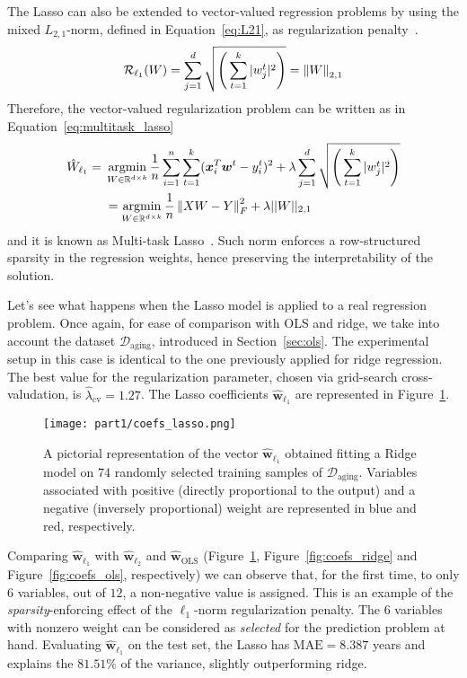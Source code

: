 			The Lasso can also be extended to vector-valued regression problems by using the mixed $L_{2,1}$-norm, defined in Equation~\eqref{eq:L21}, as regularization penalty~\cite{gramfort2012mixed}.
			\begin{equation}\label{eq:L21}
				\mathcal{R}_{\ell_1}(W)= \sum_{j=1}^d\sqrt{\Bigg(\sum_{t=1}^k |w_j^t|^2\Bigg)} = \left\lVert W\right\rVert_{2,1}
			\end{equation}
			Therefore, the vector-valued regularization problem can be written as in Equation~\eqref{eq:multitask_lasso}
			\begin{equation} \label{eq:multitask_lasso}
				\begin{aligned}
					\hat W_{\ell_1}={} & \mathop{\mathrm{argmin}}\limits_{W \in \mathbb{R}^{d \times k}} \frac{1}{n} \sum_{i=1}^n \sum_{t=1}^k (\bm{x}_i^T\bm{w}^t - y_i^t)^2 + \lambda  \sum_{j=1}^d \sqrt{\Bigg(\sum_{t=1}^k |w_j^t|^2\Bigg)} \\
					& =	\mathop{\mathrm{argmin}}\limits_{W \in \mathbb{R}^{d \times k}} \frac{1}{n} \left\lVert XW - Y\right\rVert_F^2 + \lambda ||W||_{2,1}
				\end{aligned}
			\end{equation}
			and it is known as Multi-task Lasso~\cite{lee2010adaptive}. Such norm enforces a row-structured sparsity in the regression weights, hence preserving the interpretability of the solution.

			Let's see what happens when the Lasso model is applied to a real regression problem. Once again, for ease of comparison with OLS and ridge, we take into account the dataset $\mathcal{D}_{\text{aging}}$, introduced in Section~\ref{sec:ols}. The experimental setup in this case is identical to the one previously applied for ridge regression. The best value for the regularization parameter, chosen via grid-search cross-valudation, is $\hat \lambda_{\text{cv}}=1.27$. The Lasso coefficients $\bm{ \hat w}_{\ell_1}$ are represented in Figure~\ref{fig:coefs_lasso}.
			\begin{figure}[!h]
				\centering
				\texttt{[image: part1/coefs\_lasso.png]}
				\caption{A pictorial representation of the vector $\bm{\hat w}_{\ell_1}$ obtained fitting a Ridge model on $74$ randomly selected training samples of $\mathcal{D}_{\text{aging}}$. Variables associated with positive (\ie directly proportional to the output) and a negative (\ie inversely proportional) weight are represented in blue and red, respectively.} \label{fig:coefs_lasso}
			\end{figure}
			Comparing $\bm{\hat w}_{\ell_1}$ with $\bm{\hat w}_{\ell_2}$ and $\bm{\hat w}_{\text{OLS}}$ (Figure~\ref{fig:coefs_lasso}, Figure~\ref{fig:coefs_ridge} and Figure~\ref{fig:coefs_ols}, respectively) we can observe that, for the first time, to only $6$ variables, out of $12$, a non-negative value is assigned. This is an example of the \textit{sparsity}-enforcing effect of the $\ell_1$-norm regularization penalty.
			The $6$ variables with nonzero weight can be considered as \textit{selected} for the prediction problem at hand.
			Evaluating $\bm{\hat w}_{\ell_1}$ on the test set, the Lasso has  $\text{MAE}=8.387$ years and explains the $81.51\%$ of the variance, slightly outperforming ridge.

